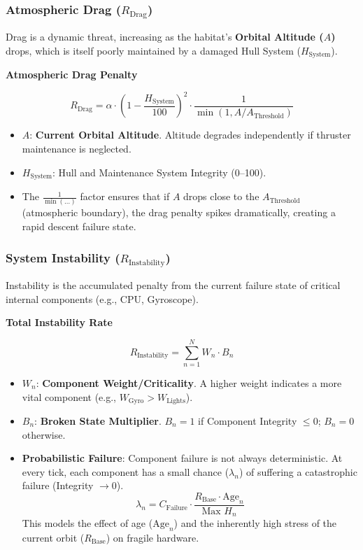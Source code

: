 \documentclass{article}
\newenvironment{mathbox}[1][\unskip]{
    \begin{tcolorbox}
    \textbf{#1}
}{
    \end{tcolorbox}
}
\begin{document}
\subsubsection{Atmospheric Drag ($R_{\text{Drag}}$)}
Drag is a dynamic threat, increasing as the habitat's \textbf{Orbital Altitude ($A$)} drops, which is itself poorly maintained by a damaged Hull System ($H_{\text{System}}$).

\begin{mathbox}[\color{DeepVoid}Atmospheric Drag Penalty]
$$
R_{\text{Drag}} = \alpha \cdot \left(1 - \frac{H_{\text{System}}}{100}\right)^2 \cdot \frac{1}{\min(1, A/A_{\text{Threshold}})}
$$
\end{mathbox}

\begin{itemize}
    \item $A$: \textbf{Current Orbital Altitude}. Altitude degrades independently if thruster maintenance is neglected.
    \item $H_{\text{System}}$: Hull and Maintenance System Integrity (0--100).
    \item The $\frac{1}{\min(\dots)}$ factor ensures that if $A$ drops close to the $A_{\text{Threshold}}$ (atmospheric boundary), the drag penalty spikes dramatically, creating a rapid descent failure state.
\end{itemize}

\subsubsection{System Instability ($R_{\text{Instability}}$)}
Instability is the accumulated penalty from the current failure state of critical internal components (e.g., CPU, Gyroscope).

\begin{mathbox}[\color{DeepVoid}Total Instability Rate]
$$
R_{\text{Instability}} = \sum_{n=1}^N W_n \cdot B_n
$$
\end{mathbox}

\begin{itemize}
    \item $W_n$: \textbf{Component Weight/Criticality}. A higher weight indicates a more vital component (e.g., $W_{\text{Gyro}} > W_{\text{Lights}}$).
    \item $B_n$: \textbf{Broken State Multiplier}. $B_n=1$ if Component Integrity $\le 0$; $B_n=0$ otherwise.
    \item \textbf{Probabilistic Failure}: Component failure is not always deterministic. At every tick, each component has a small chance ($\lambda_n$) of suffering a catastrophic failure (Integrity $\to 0$).
    $$
    \lambda_n = C_{\text{Failure}} \cdot \frac{R_{\text{Base}} \cdot \text{Age}_n}{\text{Max } H_{n}}
    $$
    This models the effect of age ($\text{Age}_n$) and the inherently high stress of the current orbit ($R_{\text{Base}}$) on fragile hardware.
\end{itemize}
\end{document}
